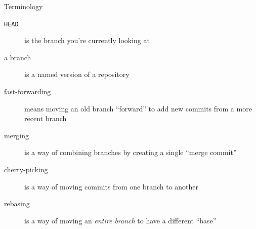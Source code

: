 \begin{frame}{Terminology}
  \begin{description}
    \item[\texttt{HEAD}] is the branch you're currently looking at
    \item[a branch] is a named version of a repository
    \item[fast-forwarding] means moving an old branch \enquote{forward} to add
      new commits from a more recent branch
    \item[merging] is a way of combining branches by creating a single
      \enquote{merge commit}
    \item[cherry-picking] is a way of moving commits from one branch to another
    \item[rebasing] is a way of moving an \textit{entire branch} to have a
      different \enquote{base}
  \end{description}
\end{frame}

